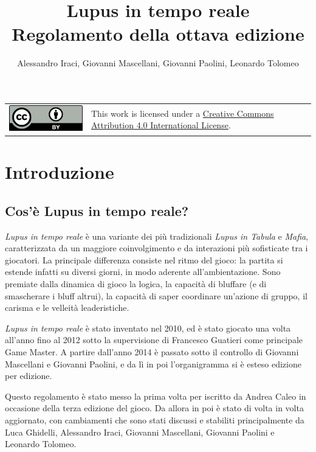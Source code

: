 \documentclass[a4paper,10pt]{article}
\title{Lupus in tempo reale\\ Regolamento della ottava edizione}
\author{Alessandro Iraci, Giovanni Mascellani, Giovanni Paolini, Leonardo Tolomeo}
\begin{document}
	
\maketitle

\begin{tabular}{lp{}}
	\begin{minipage}{0.22\textwidth}
		\vspace{3mm}
		\href{http://creativecommons.org/licenses/by/4.0/}{\includegraphics{ccby.pdf}}
	\end{minipage}
	&
	This work is licensed under a \href{http://creativecommons.org/licenses/by/4.0/}{Creative Commons Attribution 4.0 International License}.
\end{tabular}


\section{Introduzione}

\subsection{Cos'è Lupus in tempo reale?}

\emph{Lupus in tempo reale} è una variante dei più tradizionali \emph{Lupus in Tabula} e \emph{Mafia}, caratterizzata da un maggiore coinvolgimento e da interazioni più sofisticate tra i giocatori.
La principale differenza consiste nel ritmo del gioco: la partita si estende infatti su diversi giorni, in modo aderente all'ambientazione.
Sono premiate dalla dinamica di gioco la logica, la capacità di bluffare (e di smascherare i bluff altrui), la capacità di saper coordinare un’azione di gruppo, il carisma e le velleità leaderistiche.

\emph{Lupus in tempo reale} è stato inventato nel 2010, ed è stato giocato una volta all'anno fino al 2012 sotto la supervisione di Francesco Guatieri come principale Game Master. A partire dall'anno 2014 è passato sotto il controllo di Giovanni Mascellani e Giovanni Paolini, e da lì in poi l'organigramma si è esteso edizione per edizione.

Questo regolamento è stato messo la prima volta per iscritto da Andrea Caleo in occasione della terza edizione del gioco. Da allora in poi è stato di volta in volta aggiornato, con cambiamenti che sono stati discussi e stabiliti principalmente da Luca Ghidelli, Alessandro Iraci, Giovanni Mascellani, Giovanni Paolini e Leonardo Tolomeo.
\end{document}
